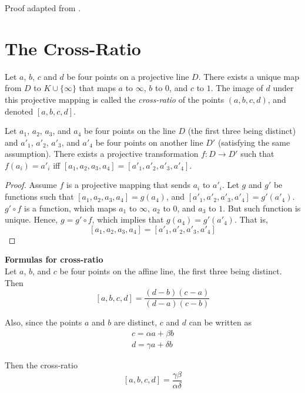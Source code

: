 Proof adapted from \cite{brannan}.

\section{The Cross-Ratio}

\begin{definition}
  Let $a$, $b$, $c$ and $d$ be four points on a projective line $D$. There exists a unique map
  from $D$ to $K\cup\{\infty\}$ that maps $a$ to $\infty$, $b$ to $0$, and $c$ to $1$. The
  image of $d$ under this projective mapping is called the \textit{cross-ratio} of the points
  $(a,b,c,d)$, and denoted $[a,b,c,d]$.
\end{definition}

\begin{prop}
  Let $a_1$, $a_2$, $a_3$, and $a_4$ be four points on the line $D$ (the first three being
  distinct) and $a'_1$, $a'_2$, $a'_3$, and $a'_4$ be four points on another line $D'$
  (satisfying the same assumption). There exists a projective transformation $f:D\rightarrow D'$
  such that $f(a_i)=a'_i$ iff $[a_1,a_2,a_3,a_4]=[a'_1,a'_2,a'_3,a'_4]$.
\end{prop}

\begin{proof}
  Assume $f$ is a projective mapping that sends $a_i$ to $a'_i$. Let $g$ and $g'$ be functions
  such that $[a_1,a_2,a_3,a_4]=g(a_4)$, and $[a'_1,a'_2,a'_3,a'_4]=g'(a'_4)$. $g'\circ f$ is a
  function, which maps $a_1$ to $\infty$, $a_2$ to $0$, and $a_3$ to $1$. But such function is
  unique. Hence, $g=g'\circ f$, which implies that $g(a_4)=g'(a'_4)$. That is,
  \[
    [a_1,a_2,a_3,a_4]=[a'_1,a'_2,a'_3,a'_4]
  \]
\end{proof}

\begin{remark} \textbf{Formulas for cross-ratio}\\
  Let $a$, $b$, and $c$ be four points on the affine line, the first three being distinct. Then
  \[
    [a,b,c,d]=\frac{(d-b)(c-a)}{(d-a)(c-b)}
  \]

  Also, since the points $a$ and $b$ are distinct, $c$ and $d$ can be written as
  \begin{eqnarray*}
    c=\alpha a+\beta b \\
    d=\gamma a+\delta b
  \end{eqnarray*}

  Then the cross-ratio
  \[
    [a,b,c,d]=\frac{\gamma\beta}{\alpha\delta}
  \]
\end{remark}

